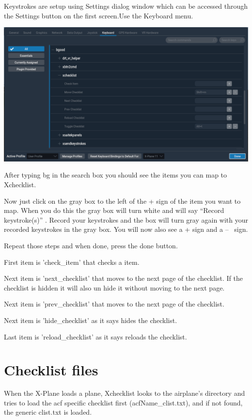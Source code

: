 \documentclass[11pt,parskip=half,a4paper]{scrartcl}
\begin{document}
Keystrokes are setup using Settings dialog window which can be accessed through the Settings button on the first screen.Use the Keyboard menu.

\begin{center}
\includegraphics[width=17cm]{XP11_KeystrokesSetup.png}
\end{center}

After typing bg in the search box you should see the items you can map to Xchecklist.

Now just click on the gray box to the left of the + sign of the item you want to map. When you do this the gray box will turn white and will say ``Record keystroke(s)'' . Record your keystrokes and the box will turn gray again with your recorded keystrokes in the gray box. You will now also see a + sign and a -- \ sign.

Repeat those steps and when done, press the done button. 

First item is 'check\_item' that checks a item. 

Next item is 'next\_checklist' that moves to the next page of the checklist. If the checklist is hidden it 
will also un hide it without moving to the next page. 

Next item is 'prev\_checklist' that moves to the next page of the checklist.

Next item is 'hide\_checklist' as it says hides the checklist.

Last item is 'reload\_checklist' as it says reloads the checklist.

\newpage
\section{Checklist files}

When the X-Plane loads a plane, Xchecklist looks to the airplane's directory and tries to load the acf specific
checklist first (acfName\_clist.txt), and if not found, the generic clist.txt is loaded.
\end{document}
